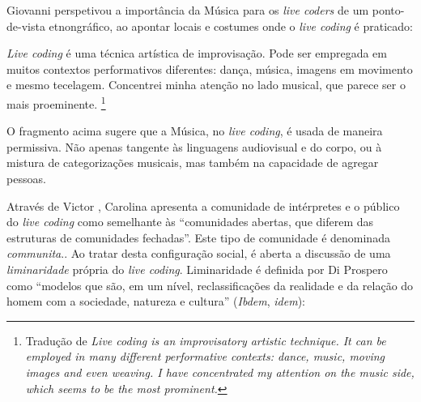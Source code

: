 Giovanni  perspetivou a importância da Música para os \emph{live coders} de um ponto-de-vista etnongráfico, ao apontar locais e costumes onde o \emph{live coding} é praticado:

\begin{citacao}
\emph{Live coding} é uma técnica artística de improvisação. Pode ser empregada em muitos contextos performativos diferentes: dança, música, imagens em movimento e mesmo tecelagem. Concentrei minha atenção no lado musical, que parece ser o mais proeminente. \cite[p.~117]{mori_analysing_2015}\footnote{Tradução de \emph{Live coding is an improvisatory artistic technique. It can be employed in many different performative contexts: dance, music, moving images and even weaving. I have concentrated my attention on the music side, which seems to be the most prominent.}}
\end{citacao}

O fragmento acima sugere que a Música, no \emph{live coding}, é usada de maneira permissiva. Não apenas tangente às linguagens audiovisual e do corpo, ou à mistura de categorizações musicais,  mas também na capacidade de agregar pessoas. 

Através de Victor , Carolina  apresenta a comunidade de intérpretes e o público do \emph{live coding} como semelhante às ``comunidades abertas, que diferem das estruturas de comunidades fechadas''. Este tipo de comunidade é denominada \emph{communita}.. Ao tratar desta configuração social, é aberta a discussão de uma \emph{liminaridade} própria do \emph{live coding}. Liminaridade é definida por Di Prospero como ``modelos que são, em um nível, reclassificações da realidade e da relação do homem com a sociedade, natureza e cultura'' (\emph{Ibdem}, \emph{idem}):

